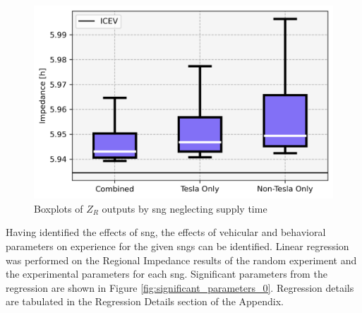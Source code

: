 \begin{multicols}{2}
\begin{figure}[H]
	\centering
	\includegraphics[width = \linewidth]{figs/Networks_Boxplots_Impedance_Driving.png}
	\caption{Boxplots of $Z_R$ outputs by \gls{sng} neglecting supply time}
	\label{fig:networks_boxplots_driving}
\end{figure}

Having identified the effects of \gls{sng}, the effects of vehicular and behavioral parameters on experience for the given \glspl{sng} can be identified. Linear regression was performed on the Regional Impedance results of the random experiment and the experimental parameters for each \gls{sng}. Significant parameters from the regression are shown in Figure \ref{fig:significant_parameters_0}. Regression details are tabulated in the Regression Details section of the Appendix. 

\end{multicols}

